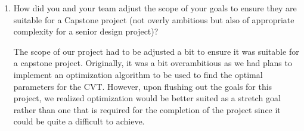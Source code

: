 \documentclass{article}
\begin{document}
\begin{enumerate}
    \item How did you and your team adjust the scope of your goals to ensure
    they are suitable for a Capstone project (not overly ambitious but also of
    appropriate complexity for a senior design project)?

    The scope of our project had to be adjusted a bit to ensure it was suitable
    for a capstone project. Originally, it was a bit overambitious as we
    had plans to implement an optimization algorithm to be used to find the
    optimal parameters for the CVT. However, upon flushing out the goals for
    this project, we realized optimization would be better suited as a
    stretch goal rather than one that is required for the completion of the project
    since it could be quite a difficult to achieve.
    \end{enumerate}  
\end{document}
